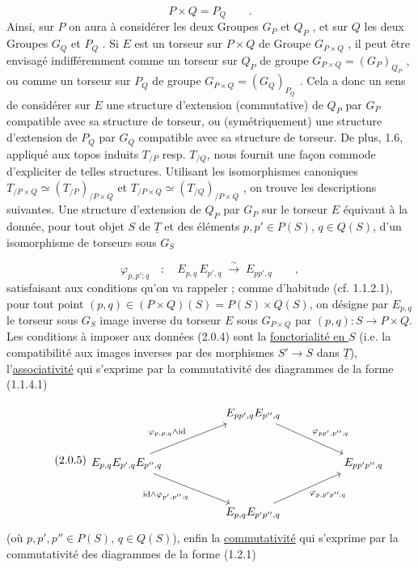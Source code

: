 \begin{equation}\tag{2.0.3}
P\times Q = P_Q \qquad .
\end{equation}
Ainsi, sur $P$ on  aura à considérer les deux Groupes $G_P$ et $Q_P$ , et sur $Q$ les deux Groupes $G_Q$ et $P_Q$ . Si $E$ est un torseur sur $P\times Q$ de Groupe $G_{P\times Q}$ , il peut être envisagé indifféremment comme un torseur sur $Q_P$ de groupe $G_{P\times Q} = (G_P)_{Q_P}$ , ou comme un torseur sur $P_Q$ de groupe $G_{P\times Q}=(G_Q)_{P_Q}$ . Cela a donc un sens de considérer sur $E$ une structure d'extension (commutative) de $Q_P$ par $G_P$ compatible avec sa structure de torseur, ou (symétriquement)
une structure d'extension de $P_Q$ par $G_Q$ compatible avec sa structure de torseur. De plus, 1.6, appliqué aux topos induits $T_{/P}$ resp. $T_{/Q}$, nous fournit une façon commode d'expliciter de telles structures. Utilisant les isomorphismes canoniques $T_{/P\times Q} \simeq (T_{/P})_{/P\times Q}$ et $T_{/P\times Q} \simeq (T_{/Q})_{/P\times Q}$ , on trouve les descriptions suivantes. Une structure d'extension de $Q_P$ par $G_P$ sur le torseur $E$ équivaut à la donnée, pour tout objet $S$ de $\underline{T}$ et des éléments $p,p' \in P(S)$, $q \in Q(S)$, d'un isomorphisme de torseurs sous $G_S$

\begin{equation}\tag{2.0.4}
\varphi_{p,p';q} \quad : \quad E_{p,q}\,E_{p',q} \;\overset{\sim}{\longrightarrow}\; E_{pp',q} \qquad ,
\end{equation}
satisfaisant aux conditions qu'on va rappeler ; comme d'habitude (cf. 1.1.2.1), pour tout point $(p,q) \in (P\times Q)(S) = P(S)\times Q(S)$, on désigne par $E_{p,q}$ le torseur sous $G_S$ image inverse du torseur $E$ sous $G_{P\times Q}$ par $(p,q) : S \longrightarrow P\times Q$. Les conditions à imposer aux données (2.0.4) sont la \underline{fonctorialité en $S$} (i.e. la compatibilité aux images inverses par des morphismes $S' \longrightarrow S$ dans $\underline{T}$), l'\underline{associativité} qui s'exprime par la commutativité des diagrammes de la forme (1.1.4.1)

\begin{equation}\tag{2.0.5}
\begin{tikzcd}[column sep=huge, row sep=large]
 & E_{pp',q}E_{p'',q} \arrow[rd, "{\varphi_{pp',p'';q}}"] & \\
E_{p,q}E_{p',q}E_{p'',q} \arrow[ru, "{\varphi_{p,p;q}\wedge \mathrm{id}}"] \arrow[rd, "{\mathrm{id}\wedge\varphi_{p',p'';q}}"'] & & E_{pp'p'',q} \\
 & E_{p,q}E_{p'p'',q} \arrow[ru, "{\varphi_{p,p'p'';q}}"'] &
\end{tikzcd}
\end{equation}
(où $p,p',p'' \in P(S)$, $q \in Q(S)$), enfin la \underline{commutativité} qui s'exprime par la commutativité des diagrammes de la forme (1.2.1) 



